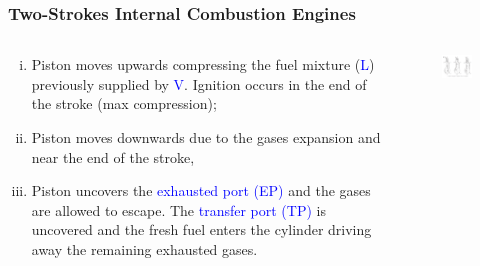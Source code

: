 \documentclass[10pt,compress]{beamer}
\begin{document}
\begin{frame}
 \frametitle{Two-Strokes Internal Combustion Engines}
  \begin{columns}
   \begin{column}[c]{0.4\linewidth}
    \begin{enumerate}[(i)]
     \item <1-> Piston moves upwards compressing the fuel mixture (\textcolor{blue}{L}) previously supplied by \textcolor{blue}{V}. Ignition occurs in the end of the stroke (max compression);
     \item <2-> Piston moves downwards due to the gases expansion and near the end of the stroke, 
     \item <3-> Piston uncovers the \textcolor{blue}{exhausted port (EP)} and the gases are allowed to escape. The \textcolor{blue}{transfer port (TP)} is uncovered and the fresh fuel enters the cylinder driving away the remaining exhausted gases.
    \end{enumerate}
   \end{column}
   \begin{column}[c]{0.6\linewidth}
    \begin{figure}%
     \begin{center}
      \includegraphics[width=7.5cm,clip]{./Pics/InternalCombustion_2Strokes_Otto}
     \end{center}
    \end{figure}  
   \end{column}  
  \end{columns}
\end{frame}
\end{document}
